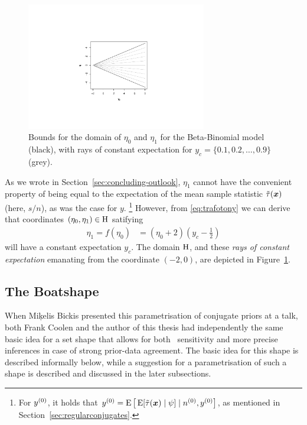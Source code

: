 \begin{figure}  %
\centering
\includegraphics[trim = 80mm 45mm 80mm 60mm, clip, width=0.7\textwidth]{R/boatshape-domain}
\caption[Bounds for the domain of $\eta_0$ and $\eta_1$ for the Beta-Binomial model,
with rays of constant expectation for $y_c = \{0.1,0.2,\ldots,0.9\}$.]%
{Bounds for the domain of $\eta_0$ and $\eta_1$ for the Beta-Binomial model (black),
with rays of constant expectation for $y_c = \{0.1,0.2,\ldots,0.9\}$ (grey).}
\label{fig:boatshape-domain}
\end{figure}

As we wrote in Section~\ref{sec:concluding-outlook},
$\eta_1$ cannot have the convenient property of being equal to
the expectation of the mean sample statistic $\tilde{\tau}({\bm x})$ (here, $s/n$),
as was the case for $y$.%
\footnote{For $y^{(0)}$, it holds that $y^{(0)} = \operatorname{E}\big[\operatorname{E}[\tilde{\tau}({\bm x}) \mid \psi] \mid n^{(0)}, y^{(0)}\big]$,
as mentioned in Section~\ref{sec:regularconjugates}.}
However, from \eqref{eq:trafotony} we can derive that coordinates $(\eta_0,\eta_1) \in \mathrm{H}$ satifying
\begin{align}
\label{eq:raysofconstantexpectation}
\eta_1 = f(\eta_0) &= (\eta_0 + 2)(y_c - \frac{1}{2}) 
\end{align}
will have a constant expectation $y_c$.
The domain $\mathrm{H}$, and these \emph{rays of constant expectation} emanating from the coordinate $(-2,0)$,
are depicted in Figure~\ref{fig:boatshape-domain}.

\subsection{The Boatshape}
\label{sec:boatshape-2}

When Mi\c{k}elis Bickis presented this parametrisation of conjugate priors at a talk,
both Frank Coolen and the author of this thesis had independently the same basic idea
for a set shape that allows for both \pdc\ sensitivity
and more precise inferences in case of strong prior-data agreement.
The basic idea for this shape is described informally below,
while a suggestion for a parametrisation of such a shape is described and discussed
in the later subsections.

